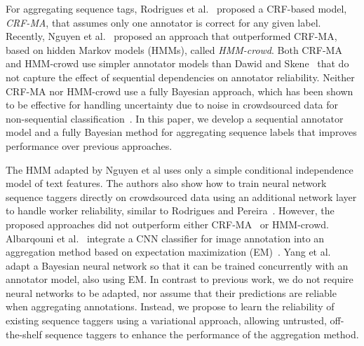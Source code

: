 For aggregating sequence tags, Rodrigues et al.~ proposed 
a CRF-based model, \emph{CRF-MA}, that assumes only one annotator is correct for any given label.
Recently, Nguyen et al.~ proposed an approach that outperformed CRF-MA,
based on hidden Markov models (HMMs), called \emph{HMM-crowd}.
Both CRF-MA and HMM-crowd use simpler annotator models than Dawid and Skene~
that do not capture the effect of sequential dependencies on annotator reliability.
Neither CRF-MA nor HMM-crowd use a fully Bayesian approach,
which has been shown to be effective for handling uncertainty
due to noise in crowdsourced data for non-sequential classification~\cite{kim2012bayesian,simpsonlong,venanzi2014community,moreno_bayesian_2015}.
In this paper, we develop a sequential annotator model and a fully Bayesian method for aggregating sequence labels  that improves performance over previous approaches.


The HMM adapted by Nguyen et al  uses only a simple conditional independence model of text features. 
The authors also show how to train 
neural network sequence taggers directly on crowdsourced data
using an additional network layer to handle worker reliability, similar to Rodrigues and Pereira~.
However, the proposed approaches did not outperform either CRF-MA~\cite{rodrigues2018deep} or HMM-crowd\cite{nguyen2017aggregating}. 
Albarqouni et al.~
integrate a CNN classifier for image annotation
into an aggregation method based on 
expectation maximization (EM)~\cite{dempster_maximum_1977}.
Yang et al.~  
adapt a Bayesian neural network so that it can be trained concurrently with an annotator model, also using EM. 
In contrast to previous work,
we do not require neural networks to be adapted, 
nor assume that their predictions are reliable 
when aggregating annotations.
Instead, we propose to learn the reliability of  
existing sequence taggers using a variational approach, 
allowing untrusted, off-the-shelf sequence taggers to enhance the performance of
the aggregation method. 

%
